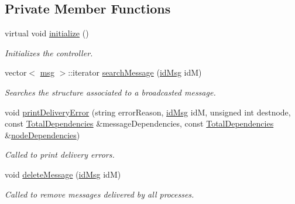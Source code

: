 \subsection*{Private Member Functions}
\begin{DoxyCompactItemize}
\item 
virtual void \hyperlink{class_controller_a28d5755bc8fed07cebd88f857f0f83df}{initialize} ()
\begin{DoxyCompactList}\small\item\em Initializes the controller. \end{DoxyCompactList}\item 
vector$<$ \hyperlink{_controller_8h_afa0f3b802fbc219228f7bb97996fa558}{msg} $>$\+::iterator \hyperlink{class_controller_aa32d5c18e9e30caf2900527e42b93d44}{search\+Message} (\hyperlink{structures_8h_a83a1d9a070efa5341da84cfd8e28d3e5}{id\+Msg} idM)
\begin{DoxyCompactList}\small\item\em Searches the structure associated to a broadcasted message. \end{DoxyCompactList}\item 
void \hyperlink{class_controller_aa3c4ebef8d344e10e86c1b4f95171281}{print\+Delivery\+Error} (string error\+Reason, \hyperlink{structures_8h_a83a1d9a070efa5341da84cfd8e28d3e5}{id\+Msg} idM, unsigned int destnode, const \hyperlink{class_total_dependencies}{Total\+Dependencies} \&message\+Dependencies, const \hyperlink{class_total_dependencies}{Total\+Dependencies} \&\hyperlink{class_controller_ade3eeb8e78c5307d518e3b43967c4bac}{node\+Dependencies})
\begin{DoxyCompactList}\small\item\em Called to print delivery errors. \end{DoxyCompactList}\item 
void \hyperlink{class_controller_ab250759d5c511ceb8f35fdf9e42583cd}{delete\+Message} (\hyperlink{structures_8h_a83a1d9a070efa5341da84cfd8e28d3e5}{id\+Msg} idM)
\begin{DoxyCompactList}\small\item\em Called to remove messages delivered by all processes. \end{DoxyCompactList}\end{DoxyCompactItemize}
